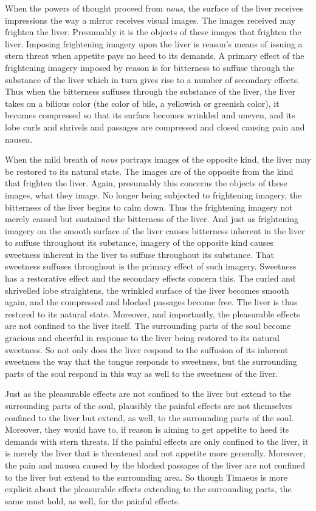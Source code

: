When the powers of thought proceed from \emph{nous}, the surface of the liver receives impressions the way a mirror receives visual images. The images received may frighten the liver. Presumably it is the objects of these images that frighten the liver. Imposing frightening imagery upon the liver is reason's means of issuing a stern threat when appetite pays no heed to its demands. A primary effect of the frightening imagery imposed by reason is for bitterness to suffuse through the substance of the liver which in turn gives rise to a number of secondary effects. Thus when the bitterness suffuses through the substance of the liver, the liver takes on a bilious color (the color of bile, a yellowish or greenish color), it becomes compressed so that its surface becomes wrinkled and uneven, and its lobe curls and shrivels and passages are compressed and closed causing pain and nausea.

When the mild breath of \emph{nous} portrays images of the opposite kind, the liver may be restored to its natural state. The images are of the opposite from the kind that frighten the liver. Again, presumably this concerns the objects of these images, what they image. No longer being subjected to frightening imagery, the bitterness of the liver begins to calm down. Thus the frightening imagery not merely caused but sustained the bitterness of the liver. And just as frightening imagery on the smooth surface of the liver causes bitterness inherent in the liver to suffuse throughout its substance, imagery of the opposite kind causes sweetness inherent in the liver to suffuse throughout its substance. That sweetness suffuses throughout is the primary effect of such imagery. Sweetness has a restorative effect and the secondary effects concern this. The curled and shrivelled lobe straightens, the wrinkled surface of the liver becomes smooth again, and the compressed and blocked passages become free. The liver is thus restored to its natural state. Moreover, and importantly, the pleasurable effects are not confined to the liver itself. The surrounding parts of the soul become gracious and cheerful in response to the liver being restored to its natural sweetness. So not only does the liver respond to the suffusion of its inherent sweetness the way that the tongue responds to sweetness, but the surrounding parts of the soul respond in this way as well to the sweetness of the liver. 

Just as the pleasurable effects are not confined to the liver but extend to the surrounding parts of the soul, plausibly the painful effects are not themselves confined to the liver but extend, as well, to the surrounding parts of the soul. Moreover, they would have to, if reason is aiming to get appetite to heed its demands with stern threats. If the painful effects are only confined to the liver, it is merely the liver that is threatened and not appetite more generally. Moreover, the pain and nausea caused by the blocked passages of the liver are not confined to the liver but extend to the surrounding area. So though Timaeus is more explicit about the pleasurable effects extending to the surrounding parts, the same must hold, as well, for the painful effects.

